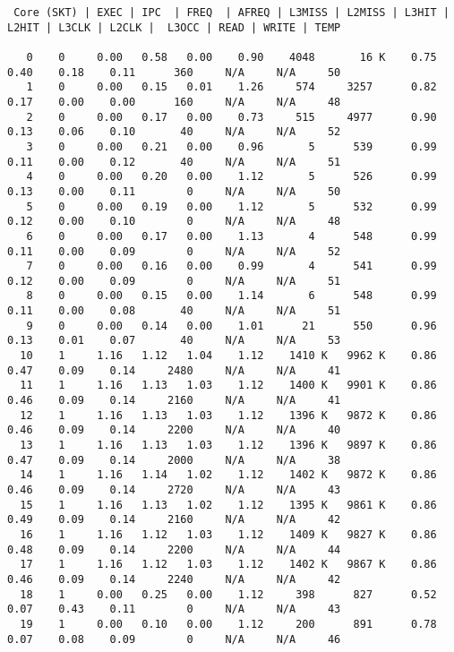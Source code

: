 \begin{lstlisting}
 Core (SKT) | EXEC | IPC  | FREQ  | AFREQ | L3MISS | L2MISS | L3HIT | L2HIT | L3CLK | L2CLK |  L3OCC | READ | WRITE | TEMP

   0    0     0.00   0.58   0.00    0.90    4048       16 K    0.75    0.40    0.18    0.11      360     N/A     N/A     50
   1    0     0.00   0.15   0.01    1.26     574     3257      0.82    0.17    0.00    0.00      160     N/A     N/A     48
   2    0     0.00   0.17   0.00    0.73     515     4977      0.90    0.13    0.06    0.10       40     N/A     N/A     52
   3    0     0.00   0.21   0.00    0.96       5      539      0.99    0.11    0.00    0.12       40     N/A     N/A     51
   4    0     0.00   0.20   0.00    1.12       5      526      0.99    0.13    0.00    0.11        0     N/A     N/A     50
   5    0     0.00   0.19   0.00    1.12       5      532      0.99    0.12    0.00    0.10        0     N/A     N/A     48
   6    0     0.00   0.17   0.00    1.13       4      548      0.99    0.11    0.00    0.09        0     N/A     N/A     52
   7    0     0.00   0.16   0.00    0.99       4      541      0.99    0.12    0.00    0.09        0     N/A     N/A     51
   8    0     0.00   0.15   0.00    1.14       6      548      0.99    0.11    0.00    0.08       40     N/A     N/A     51
   9    0     0.00   0.14   0.00    1.01      21      550      0.96    0.13    0.01    0.07       40     N/A     N/A     53
  10    1     1.16   1.12   1.04    1.12    1410 K   9962 K    0.86    0.47    0.09    0.14     2480     N/A     N/A     41
  11    1     1.16   1.13   1.03    1.12    1400 K   9901 K    0.86    0.46    0.09    0.14     2160     N/A     N/A     41
  12    1     1.16   1.13   1.03    1.12    1396 K   9872 K    0.86    0.46    0.09    0.14     2200     N/A     N/A     40
  13    1     1.16   1.13   1.03    1.12    1396 K   9897 K    0.86    0.47    0.09    0.14     2000     N/A     N/A     38
  14    1     1.16   1.14   1.02    1.12    1402 K   9872 K    0.86    0.46    0.09    0.14     2720     N/A     N/A     43
  15    1     1.16   1.13   1.02    1.12    1395 K   9861 K    0.86    0.49    0.09    0.14     2160     N/A     N/A     42
  16    1     1.16   1.12   1.03    1.12    1409 K   9827 K    0.86    0.48    0.09    0.14     2200     N/A     N/A     44
  17    1     1.16   1.12   1.03    1.12    1402 K   9867 K    0.86    0.46    0.09    0.14     2240     N/A     N/A     42
  18    1     0.00   0.25   0.00    1.12     398      827      0.52    0.07    0.43    0.11        0     N/A     N/A     43
  19    1     0.00   0.10   0.00    1.12     200      891      0.78    0.07    0.08    0.09        0     N/A     N/A     46

\end{lstlisting}
